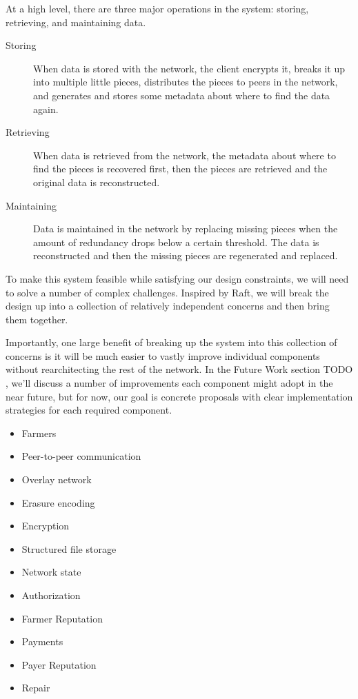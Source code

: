 \documentclass[a4paper,10pt]{article}
\newcommand{\todo}[1]{{\color{red} TODO #1}}
\begin{document}
At a high level, there are three major operations in the system: storing,
retrieving, and maintaining data.

\begin{description}

\item[Storing]
When data is stored with the network, the client encrypts it, breaks it up into
multiple little pieces, distributes the pieces to peers in the network, and
generates and stores some metadata about where to find the data again.

\item[Retrieving]
When data is retrieved from the network, the metadata about where to find the
pieces is recovered first, then the pieces are retrieved and the original data
is reconstructed.

\item[Maintaining]
Data is maintained in the network by replacing missing pieces when the amount
of redundancy drops below a certain threshold. The data is reconstructed and
then the missing pieces are regenerated and replaced.

\end{description}

To make this system feasible while satisfying our design constraints, we will
need to solve a number of complex challenges. Inspired by Raft\cite{raft}, we
will break the design up into a collection of relatively independent concerns
and then bring them together.

Importantly, one large benefit of breaking up
the system into this collection of concerns is it will be much easier to
vastly improve individual components without rearchitecting the rest of the
network. In the Future Work section \todo{}, we'll discuss a number of
improvements each component might adopt in the near future, but for now, our
goal is concrete proposals with clear implementation strategies for each
required component.

\begin{itemize}
\item Farmers
\item Peer-to-peer communication
\item Overlay network
\item Erasure encoding
\item Encryption
\item Structured file storage
\item Network state
\item Authorization
\item Farmer Reputation
\item Payments
\item Payer Reputation
\item Repair
\end{itemize}
\end{document}
